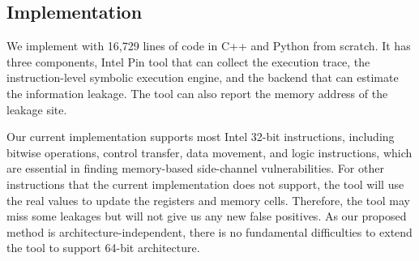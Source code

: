\subsection{Implementation}
We implement \tool{} with 16,729 lines of code in C++ and Python from scratch. It has three
components, Intel Pin tool that can collect the execution trace, the
instruction-level symbolic execution engine, and the backend that can estimate
the information leakage. 
The tool can also report the memory address of
the leakage site. 


Our current implementation supports most Intel 32-bit instructions,
including bitwise operations, control transfer, data movement, and logic
instructions, which are essential in finding memory-based side-channel
vulnerabilities. For other instructions that the current implementation does not
support, the tool will use the real values to update the registers and memory
cells. Therefore, the tool may miss some leakages but will not give us any new
false positives. As our proposed method is architecture-independent,
there is no fundamental difficulties to extend the tool to support 64-bit
architecture. 
